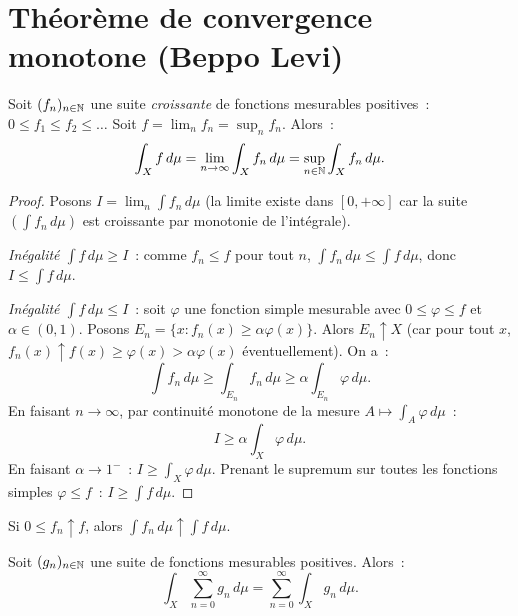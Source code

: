 \section{Th\'eor\`eme de convergence monotone (Beppo Levi)}

\begin{theoreme}
\label{thm:convergence_monotone}
Soit $(f_n)_{n \in \mathbb{N}}$ une suite \emph{croissante} de fonctions mesurables
positives~: $0 \leq f_1 \leq f_2 \leq \ldots$ Soit $f = \lim_n f_n =
\sup_n f_n$. Alors~:
\[
\int_X f\, d\mu = \lim_{n \to \infty} \int_X f_n\, d\mu
= \sup_{n \in \mathbb{N}} \int_X f_n\, d\mu.
\]
\end{theoreme}

\begin{proof}
Posons $I = \lim_n \int f_n\, d\mu$ (la limite existe dans $[0, +\infty]$ car la
suite $(\int f_n\, d\mu)$ est croissante par monotonie de l'int\'egrale).

\emph{In\'egalit\'e $\int f\, d\mu \geq I$}~: comme $f_n \leq f$ pour tout $n$,
$\int f_n\, d\mu \leq \int f\, d\mu$, donc $I \leq \int f\, d\mu$.

\emph{In\'egalit\'e $\int f\, d\mu \leq I$}~: soit $\varphi$ une fonction simple
mesurable avec $0 \leq \varphi \leq f$ et $\alpha \in (0, 1)$. Posons
$E_n = \{x : f_n(x) \geq \alpha \varphi(x)\}$. Alors $E_n \uparrow X$ (car
pour tout $x$, $f_n(x) \uparrow f(x) \geq \varphi(x) > \alpha \varphi(x)$
\'eventuellement). On a~:
\[
\int f_n\, d\mu \geq \int_{E_n} f_n\, d\mu \geq \alpha \int_{E_n} \varphi\, d\mu.
\]
En faisant $n \to \infty$, par continuit\'e monotone de la mesure
$A \mapsto \int_A \varphi\, d\mu$~:
\[
I \geq \alpha \int_X \varphi\, d\mu.
\]
En faisant $\alpha \to 1^-$~: $I \geq \int_X \varphi\, d\mu$. Prenant le supremum
sur toutes les fonctions simples $\varphi \leq f$~: $I \geq \int f\, d\mu$.
\end{proof}

\begin{formules}[title=\textbf{Convergence monotone}]
Si $0 \leq f_n \uparrow f$, alors
$\displaystyle\int f_n\, d\mu \uparrow \int f\, d\mu$.
\end{formules}

\begin{corollaire}
Soit $(g_n)_{n \in \mathbb{N}}$ une suite de fonctions mesurables positives. Alors~:
\[
\int_X \sum_{n=0}^{\infty} g_n\, d\mu = \sum_{n=0}^{\infty} \int_X g_n\, d\mu.
\]
\end{corollaire}

